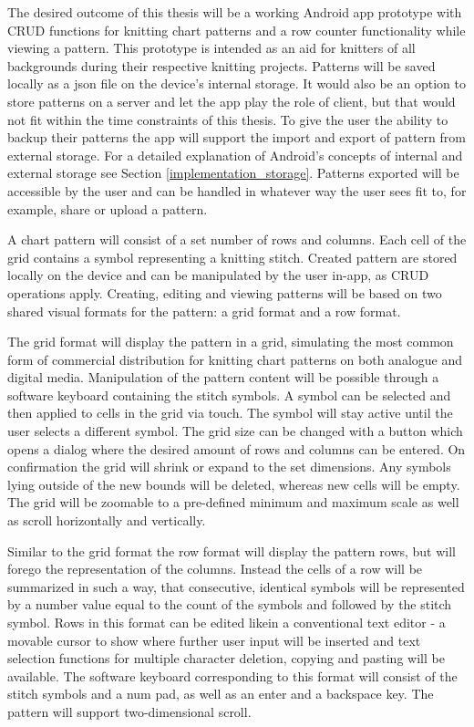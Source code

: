 The desired outcome of this thesis will be a working Android app prototype with CRUD functions for knitting chart patterns and a row counter functionality while viewing a pattern. This prototype is intended as an aid for knitters of all backgrounds during their respective knitting projects. Patterns will be saved locally as a \gls{json} file on the device's internal storage. It would also be an option to store patterns on a server and let the app play the role of client, but that would not fit within the time constraints of this thesis. To give the user the ability to backup their patterns the app will support the import and export of pattern from external storage. For a detailed explanation of Android's concepts of internal and external storage see Section \ref{implementation_storage}. Patterns exported will be accessible by the user and can be handled in whatever way the user sees fit to, for example, share or upload a pattern.

A chart pattern will consist of a set number of rows and columns. Each cell of the grid contains a symbol representing a knitting stitch. Created pattern are stored locally on the device and can be manipulated by the user in-app, as CRUD operations apply. Creating, editing and viewing patterns will be based on two shared visual formats for the pattern: a grid format and a row format.

The grid format will display the pattern in a grid, simulating the most common form of commercial distribution for knitting chart patterns on both analogue and digital media. Manipulation of the pattern content will be possible through a software keyboard containing the stitch symbols. A symbol can be selected and then applied to cells in the grid via touch. The symbol will stay active until the user selects a different symbol. The grid size can be changed with a button which opens a dialog where the desired amount of rows and columns can be entered. On confirmation the grid will shrink or expand to the set dimensions. Any symbols lying outside of the new bounds will be deleted, whereas new cells will be empty. The grid will be zoomable to a pre-defined minimum and maximum scale as well as scroll horizontally and vertically.

Similar to the grid format the row format will display the pattern rows, but will forego the representation of the columns. Instead the cells of a row will be summarized in such a way, that consecutive, identical symbols will be represented  by a number value equal to the count of the symbols and followed by the stitch symbol. Rows in this format can be edited likein  a conventional text editor - a movable cursor to show where further user input will be inserted and text selection functions for multiple character deletion, copying and pasting will be available. The software keyboard corresponding to this format will consist of the stitch symbols and a num pad, as well as an enter and a backspace key. The pattern will support two-dimensional scroll.

